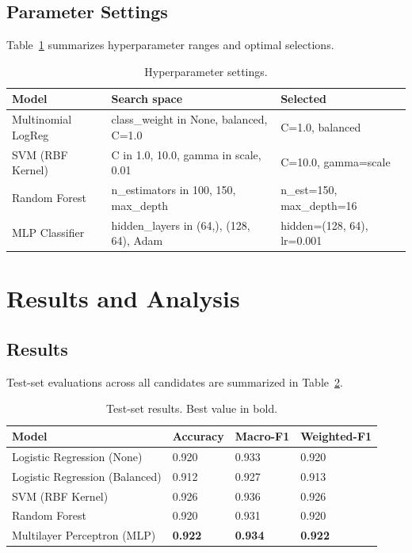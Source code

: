\documentclass[conference]{IEEEtran}
\begin{document}
\subsection{Parameter Settings}
Table~\ref{tab:hyperparams} summarizes hyperparameter ranges and optimal selections.

\begin{table}[htbp]
\caption{Hyperparameter settings.}
\label{tab:hyperparams}
\centering
\begin{tabular}{lll}
\toprule
\textbf{Model} & \textbf{Search space} & \textbf{Selected} \\
\midrule
Multinomial LogReg & class_weight in {None, balanced}, C=1.0 & C=1.0, balanced \\
SVM (RBF Kernel) & C in {1.0, 10.0}, gamma in {scale, 0.01} & C=10.0, gamma=scale \\
Random Forest & n_estimators in {100, 150}, max_depth & n_est=150, max_depth=16 \\
MLP Classifier & hidden_layers in {(64,), (128, 64)}, Adam & hidden=(128, 64), lr=0.001 \\
\bottomrule
\end{tabular}
\end{table}

\section{Results and Analysis}
\subsection{Results}
Test-set evaluations across all candidates are summarized in Table~\ref{tab:results}.

\begin{table}[htbp]
\caption{Test-set results. Best value in bold.}
\label{tab:results}
\centering
\begin{tabular}{llll}
\toprule
\textbf{Model} & \textbf{Accuracy} & \textbf{Macro-F1} & \textbf{Weighted-F1} \\
\midrule
Logistic Regression (None) & 0.920 & 0.933 & 0.920 \\
Logistic Regression (Balanced) & 0.912 & 0.927 & 0.913 \\
SVM (RBF Kernel) & 0.926 & 0.936 & 0.926 \\
Random Forest & 0.920 & 0.931 & 0.920 \\
Multilayer Perceptron (MLP) & \textbf{0.922} & \textbf{0.934} & \textbf{0.922} \\
\bottomrule
\end{tabular}
\end{table}
\end{document}
